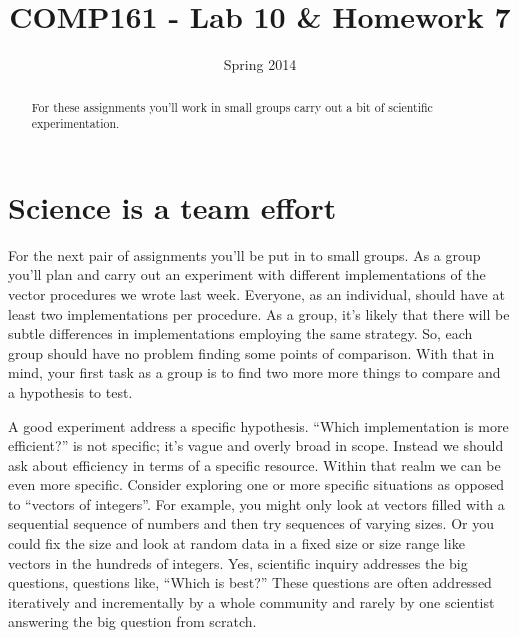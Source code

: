 \documentclass[]{tufte-handout}
\title{COMP161 - Lab 10 \& Homework 7}
\author{}
\date{Spring 2014}
\begin{document}
\maketitle

\begin{abstract}
For these assignments you'll work in small groups carry out a bit of scientific experimentation.
\end{abstract}

\section{Science is a team effort}

For the next pair of assignments you'll be put in to small groups.  As a group you'll plan and carry out an experiment with different implementations of the vector procedures we wrote last week. Everyone, as an individual, should have at least two implementations per procedure.  As a group, it's likely that there will be subtle differences in implementations employing the same strategy.  So, each group should have no problem finding some points of comparison.  With that in mind, your first task as a group is to find two more more things to compare and a hypothesis to test. 

A good experiment address a specific hypothesis. ``Which implementation is more efficient?'' is not specific; it's vague and overly broad in scope.  Instead we should ask about efficiency in terms of a specific resource.  Within that realm we can be even more specific. Consider exploring one or more specific situations as opposed to ``vectors of integers''. For example, you might only look at vectors filled with a sequential sequence of numbers and then try sequences of varying sizes.  Or you could fix the size and look at random data in a fixed size or size range like vectors in the hundreds of integers.  Yes, scientific inquiry addresses the big questions, questions like, ``Which is best?'' These questions are often addressed iteratively and incrementally by a whole community and rarely by one scientist answering the big question from scratch.
\end{document}
